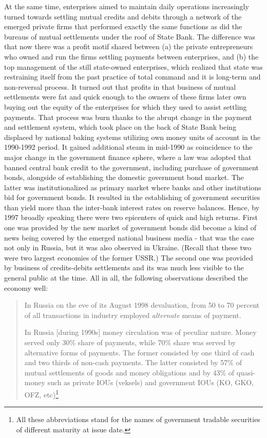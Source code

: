 At the same time, enterprises aimed to maintain daily operations increasingly turned towards settling mutual credits and debits through a network of the emerged private firms that performed exactly the same functions as did the bureaus of mutual settlements under the roof of State Bank. The difference was that now there was a profit motif shared between (a) the private entrepreneurs who owned and run the firms settling payments between enterprises, and (b) the top management of the still state-owned enterprises, which realized that state was restraining itself from the past practice of total command and it is long-term and non-reversal process. It turned out that profits in that business of mutual settlements were fat and quick enough to the owners of these firms later own buying out the equity of the enterprises for which they used to assist settling payments. That process was burn thanks to the abrupt change in the payment and settlement system, which took place on the back of State Bank being displaced by national baking systems utilizing own money units of account in the 1990-1992 period. It gained additional steam in mid-1990 as coincidence to the major change in the government finance sphere, where a law was adopted that banned central bank credit to the government, including purchase of government bonds, alongside of establishing the domestic government bond market. The latter was institutionalized as primary market where banks and other institutions bid for government bonds. It resulted in the establishing of government securities than yield more than the inter-bank interest rates on reserve balances. Hence, by 1997 broadly speaking there were two epicenters of quick and high returns. First one was provided by the new market of government bonds did become a kind of news being covered by the emerged national business media - that was the case not only in Russia, but it was also observed in Ukraine. (Recall that these two were two largest economies of the former USSR.) The second one was provided by business of credits-debits settlements and its was much less visible to the general public at the time. All in all, the following observations described the economy well: 

\begin{quote}
In Russia on the eve of its August 1998 devaluation, from 50 to 70 percent of all transactions in industry employed \textit{alternate} means of payment.\citep[p.~6, emphasis added]{woodruff2005}\par
In Russia [during 1990s] money circulation was of peculiar nature. Money served only 30\% share of payments, while 70\% share was served by alternative forms of payments. The former consisted by one third of cash and two thirds of non-cash payments. The latter consisted by 57\% of mutual settlements of goods and money obligations and by 43\% of quasi-money such as private IOUs (veksels) and government IOUs (KO, GKO, OFZ, etc)\footnote{All these abbreviations stand for the names of government tradable securities of different maturity at issue date.}~\citep[p.~144]{izvekov2009}
\end{quote}


